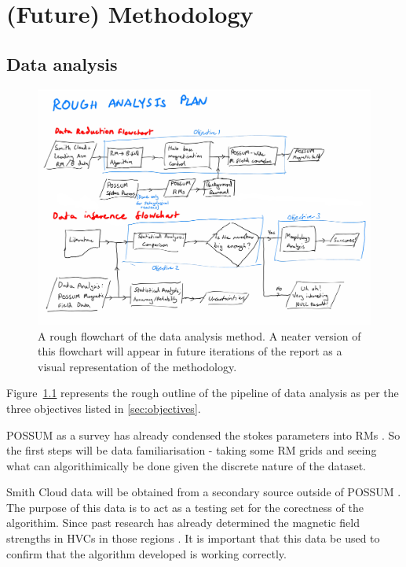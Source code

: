\chapter{(Future) Methodology}
\label{cha:methodology}

\section{Data analysis}
\label{sec:method}

\begin{figure}[h]
  \label{fig:flowchart}
  \includegraphics[width=\columnwidth]{figs/flowchart.png}
  \caption{A rough flowchart of the data analysis method. A neater version of this flowchart will appear in future iterations of the report as a visual representation of the methodology.}
\end{figure}

Figure~\ref{fig:flowchart} represents the rough outline of the pipeline of data analysis as per the three objectives listed in \ref{sec:objectives}.

POSSUM as a survey has already condensed the stokes parameters into RMs \cite{ID1, ID52}. So the first steps will be data familiarisation - taking some RM grids and seeing what can algorithimically be done given the discrete nature of the dataset.

Smith Cloud data will be obtained from a secondary source outside of POSSUM \cite{ID18, ID26, ID28}. The purpose of this data is to act as a testing set for the corectness of the algorithim. Since past research has already determined the magnetic field strengths in HVCs in those regions \cite{ID26}. It is important that this data be used to confirm that the algorithm developed is working correctly.

